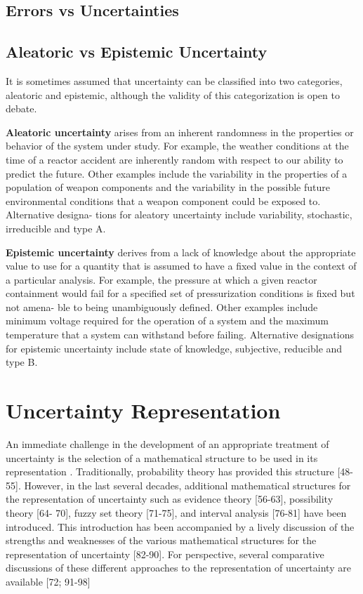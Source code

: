 \subsection{Errors vs Uncertainties}
\subsection{Aleatoric vs Epistemic Uncertainty}

It is sometimes assumed that uncertainty can be classified into two categories, aleatoric and epistemic, \cite{Kiureghian2009} although the validity of this categorization is open to debate. 

\textbf{Aleatoric uncertainty} arises from an inherent randomness in the properties or behavior of the system under study. For example, the weather conditions at the time of a reactor accident are inherently random with respect to our ability to predict the future. Other examples include the variability in the properties of a population of weapon components and the variability in the possible future environmental conditions that a weapon component could be exposed to. Alternative designa- tions for aleatory uncertainty include variability, stochastic, irreducible and type A. \cite{Helton2009}

\textbf{Epistemic uncertainty} derives from a lack of knowledge about the appropriate value to use for a quantity that is assumed to have a fixed value in the context of a particular analysis. For example, the pressure at which a given reactor containment would fail for a specified set of pressurization conditions is fixed but not amena- ble to being unambiguously defined. Other examples include minimum voltage required for the operation of a system and the maximum temperature that a system can withstand before failing. Alternative designations for epistemic uncertainty include state of knowledge, subjective, reducible and type B. \cite{Helton2009}

\section{Uncertainty Representation}

An immediate challenge in the development of an appropriate treatment of uncertainty is the selection of a mathematical structure to be used in its representation \cite{Helton2010}. Traditionally, probability theory has provided this structure [48-55]. However, in the last several decades, additional mathematical structures for the representation of uncertainty such as evidence theory [56-63], possibility theory [64- 70], fuzzy set theory [71-75], and interval analysis [76-81] have been introduced.
This introduction has been accompanied by a lively discussion of the strengths and weaknesses of the various mathematical structures for the representation of uncertainty [82-90]. For perspective, several comparative discussions of these different approaches to the representation of uncertainty are available [72; 91-98]

